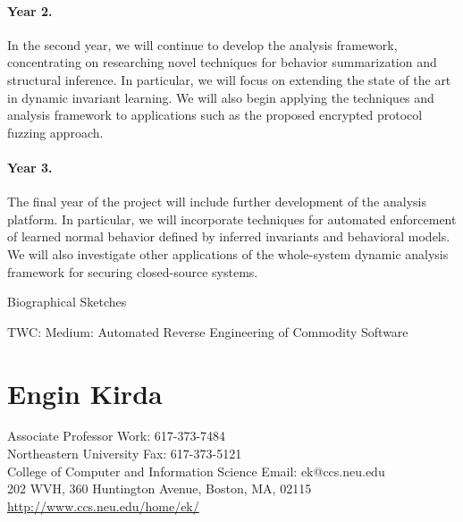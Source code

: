 \documentclass[letterpaper,twoside,11pt,headings=small]{scrartcl}
\newcommand{\basetitle}{TWC: Medium: Automated Reverse Engineering of Commodity Software}
\newcommand{\thetitle}{\basetitle\xspace}
\begin{document}
\paragraph{Year 2.} In the second year, we will continue to develop the
analysis framework, concentrating on researching novel techniques for behavior
summarization and structural inference.  In particular, we will focus on
extending the state of the art in dynamic invariant learning.  We will also
begin applying the techniques and analysis framework to applications such
as the proposed encrypted protocol fuzzing approach.

\paragraph{Year 3.} The final year of the project will include further
development of the analysis platform.  In particular, we will incorporate
techniques for automated enforcement of learned normal behavior defined by
inferred invariants and behavioral models.  We will also investigate other
applications of the whole-system dynamic analysis framework for securing
closed-source systems.


\newpage
{}
\setcounter{page}{1}
\setcounter{section}{0}



\newpage
{}
\setcounter{page}{1}
\setcounter{section}{0}

{\sffamily\bfseries
\begin{center}
\fontsize{16}{16}\selectfont Biographical Sketches

\fontsize{13}{13}\selectfont \thetitle
\end{center}
\label{sec:biosketches}
}

\section{Engin Kirda}
\label{bio}

Associate Professor \hfill Work: 617-373-7484\\
Northeastern University \hfill Fax: 617-373-5121\\
College of Computer and Information Science \hfill Email: ek@ccs.neu.edu\\
202 WVH, 360 Huntington Avenue, Boston, MA, 02115 \hfill \url{http://www.ccs.neu.edu/home/ek/}
\end{document}
